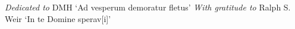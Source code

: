 \clearpage
\begin{center}
    \thispagestyle{empty}
    \vspace*{\fill}
    \emph{Dedicated to}\newline
    DMH\newline
    \vspace*{5mm}
    `Ad vesperum demoratur fletus'\newline
    \vspace*{30mm}
    \emph{With gratitude to}\newline
    Ralph S. Weir\newline
    \vspace*{5mm}
    `In te Domine sperav[i]'
    \vspace*{\fill}
\end{center}
\clearpage
{}
